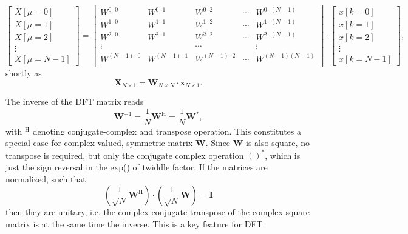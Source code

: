 \documentclass[11pt,a4paper,DIV=12]{scrartcl}
\begin{document}
\begin{equation}
\begin{bmatrix}
X[\mu=0]\\
X[\mu=1]\\
X[\mu=2]\\
\vdots\\
X[\mu=N-1]
\end{bmatrix}
=
\begin{bmatrix}
W^{0 \cdot 0} & W^{0 \cdot 1} & W^{0 \cdot 2} & \cdots & W^{0 \cdot (N-1)}\\
W^{1 \cdot 0} & W^{1 \cdot 1} & W^{1 \cdot 2} & \cdots & W^{1 \cdot (N-1)}\\
W^{2 \cdot 0} & W^{2 \cdot 1} & W^{2 \cdot 2} & \cdots & W^{2 \cdot (N-1)}\\
\vdots & & \cdots& & \vdots\\
W^{(N-1) \cdot 0} & W^{(N-1) \cdot 1} & W^{(N-1) \cdot 2} & \cdots & W^{(N-1)(N-1)}\\
\end{bmatrix} \cdot
\begin{bmatrix}
x[k=0]\\
x[k=1]\\
x[k=2]\\
\vdots\\
x[k=N-1]
\end{bmatrix},
\end{equation}
shortly as
\begin{equation}
\mathbf{X}_{N \times 1} = \mathbf{W}_{N \times N} \cdot \mathbf{x}_{N \times 1}.
\end{equation}

The inverse of the DFT matrix reads
\begin{equation}
\mathbf{W}^{-1}
= \frac{1}{N} \mathbf{W}^\mathrm{H}
= \frac{1}{N} \mathbf{W}^\mathrm{*},
\end{equation}
with
$^\mathrm{H}$ denoting conjugate-complex and transpose operation.
This constitutes a special case for complex valued, symmetric matrix $\mathbf{W}$.
%
Since $\mathbf{W}$ is also square, no transpose is required, but only the
conjugate complex operation $()^*$, which is just the sign reversal
in the exp() of twiddle factor.
%
If the matrices are normalized, such that
\begin{equation}
(\frac{1}{\sqrt{N}} \mathbf{W}^\mathrm{H}) \cdot (\frac{1}{\sqrt{N}} \mathbf{W}) = \mathbf{I}
\end{equation}
then they are unitary, i.e. the complex conjugate transpose of the complex
square matrix is at the same time the inverse.
This is a key feature for DFT.
\end{document}
